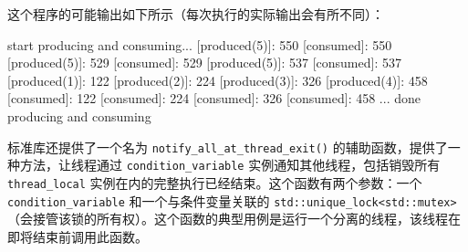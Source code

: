 这个程序的可能输出如下所示（每次执行的实际输出会有所不同）：

\begin{shell}
start producing and consuming...
[produced(5)]: 550
[consumed]: 550
[produced(5)]: 529
[consumed]: 529
[produced(5)]: 537
[consumed]: 537
[produced(1)]: 122
[produced(2)]: 224
[produced(3)]: 326
[produced(4)]: 458
[consumed]: 122
[consumed]: 224
[consumed]: 326
[consumed]: 458
...
done producing and consuming
\end{shell}

标准库还提供了一个名为 \verb|notify_all_at_thread_exit()| 的辅助函数，提供了一种方法，让线程通过 \verb|condition_variable| 实例通知其他线程，包括销毁所有 \verb|thread_local| 实例在内的完整执行已经结束。这个函数有两个参数：一个 \verb|condition_variable| 和一个与条件变量关联的 \verb|std::unique_lock<std::mutex>|（会接管该锁的所有权）。这个函数的典型用例是运行一个分离的线程，该线程在即将结束前调用此函数。








